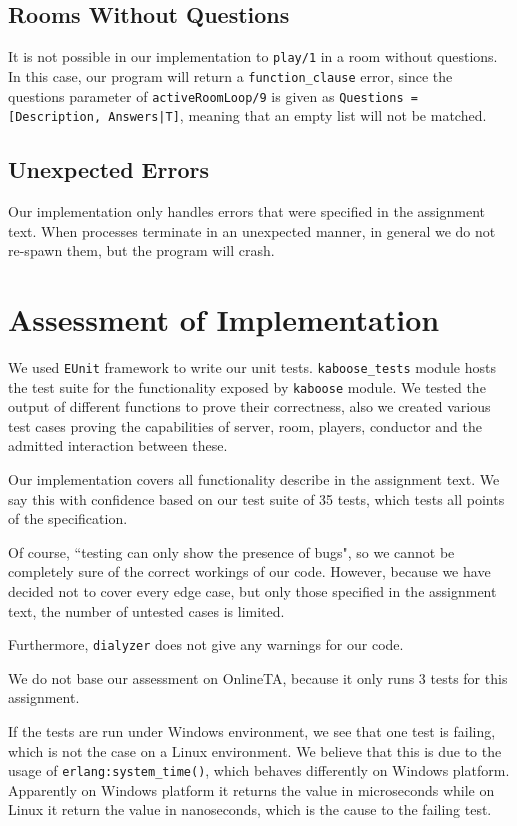 \documentclass{article}
\begin{document}
\subsection{Rooms Without Questions}
It is not possible in our implementation to \texttt{play/1} in a room without questions. In this case, our program will return a  \texttt{function\_clause} error, since the questions parameter of \texttt{activeRoomLoop/9} is given as \texttt{Questions = [{Description, Answers}|T]}, meaning that an empty list will not be matched.

\subsection{Unexpected Errors}
Our implementation only handles errors that were specified in the assignment text. When processes terminate in an unexpected manner, in general we do not re-spawn them, but the program will crash.

\section{Assessment of Implementation}
We used \texttt{EUnit} framework to write our unit tests. \texttt{kaboose\_tests} module hosts the test suite for the functionality exposed by \texttt{kaboose} module. We tested the output of different functions to prove their correctness, also we created various test cases proving the capabilities of server, room, players, conductor and the admitted interaction between these.

Our implementation covers all functionality describe in the assignment text. We say this with confidence based on our test suite of 35 tests, which tests all points of the specification.

Of course, ``testing can only show the presence of bugs", so we cannot be completely sure of the correct workings of our code. However, because we have decided not to cover every edge case, but only those specified in the assignment text, the number of untested cases is limited.

Furthermore, \texttt{dialyzer} does not give any warnings for our code.

We do not base our assessment on OnlineTA, because it only runs 3 tests for this assignment.

If the tests are run under Windows environment, we see that one test is failing, which is not the case on a Linux environment. We believe that this is due to the usage of \texttt{erlang:system\_time()}, which behaves differently on Windows platform. Apparently on Windows platform it returns the value in microseconds while on Linux it return the value in nanoseconds, which is the cause to the failing test.
\end{document}
